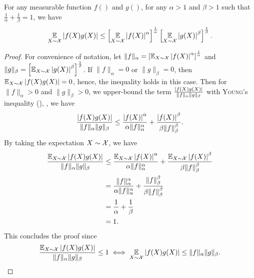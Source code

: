 \begin{theorem}
\label{ap:tools:theorem:holder}
For any measurable function $f()$ and $g()$, for any $\alpha>1$ and $\beta>1$ such that $\frac{1}{\alpha}+\frac{1}{\beta}=1$, we have
\begin{align*}
    \operatorname*{\mathbb{E}}_{X\sim\mathcal{X}}\left\vert f(X)g(X)\right\vert \le \left[\operatorname*{\mathbb{E}}_{X\sim\mathcal{X}}\left\vert f(X)\right\vert^\alpha\right]^{\frac{1}{\alpha}}\left[\operatorname*{\mathbb{E}}_{X\sim\mathcal{X}}\left\vert g(X)\right\vert^\beta\right]^{\frac{1}{\beta}}.
\end{align*}
\end{theorem}
\begin{noaddcontents}\begin{proof}
For convenience of notation, let $\|f\|_\alpha=\left[\operatorname*{\mathbb{E}}_{X\sim\mathcal{X}}\left\vert f(X)\right\vert^\alpha\right]^{\frac{1}{\alpha}}$ and $\|g\|_{\beta} = \left[\operatorname*{\mathbb{E}}_{X\sim\mathcal{X}}\left\vert g(X)\right\vert^\beta\right]^{\frac{1}{\beta}}$.
If $\|f\|_\alpha=0$ or $\|g\|_\beta=0$, then $\operatorname*{\mathbb{E}}_{X\sim\mathcal{X}}\left\vert f(X)g(X)\right\vert=0$, hence, the inequality holds in this case.
Then for $\|f\|_\alpha>0$ and $\|g\|_\beta>0$, we upper-bound the term $\frac{\left\vert f(X)g(X)\right\vert}{\|f\|_\alpha\|g\|_{\beta}}$ with \textsc{Young}'s inequality (), \ie, we have
\begin{align*}
    \frac{\left\vert f(X)g(X)\right\vert}{\|f\|_\alpha\|g\|_{\beta}} \le \frac{\left\vert f(X)\right\vert^\alpha}{\alpha \|f\|_\alpha^\alpha} + \frac{\left\vert f(X)\right\vert^\beta}{\beta \|f\|_\beta^\beta}.
\end{align*}
By taking the expectation \wrt $X\sim\mathcal{X}$, we have
\begin{align*}
    \frac{\operatorname*{\mathbb{E}}_{X\sim\mathcal{X}}\left\vert f(X)g(X)\right\vert}{\|f\|_\alpha\|g\|_{\beta}} &\le \frac{\operatorname*{\mathbb{E}}_{X\sim\mathcal{X}}\left\vert f(X)\right\vert^\alpha}{\alpha \|f\|_\alpha^\alpha} + \frac{\operatorname*{\mathbb{E}}_{X\sim\mathcal{X}}\left\vert f(X)\right\vert^\beta}{\beta \|f\|_\beta^\beta}\\
    &= \frac{\|f\|_\alpha^\alpha}{\alpha \|f\|_\alpha^\alpha} + \frac{\|f\|_\beta^\beta}{\beta \|f\|_\beta^\beta}\\
    &= \frac{1}{\alpha} + \frac{1}{\beta}\\
    &= 1.
\end{align*}
This concludes the proof since 
\begin{align*}
\frac{\operatorname*{\mathbb{E}}_{X\sim\mathcal{X}}\left\vert f(X)g(X)\right\vert}{\|f\|_\alpha\|g\|_{\beta}} \le 1 \iff \operatorname*{\mathbb{E}}_{X\sim\mathcal{X}}\left\vert f(X)g(X)\right\vert \le \|f\|_\alpha\|g\|_\beta.
\end{align*}
\end{proof}\end{noaddcontents}

